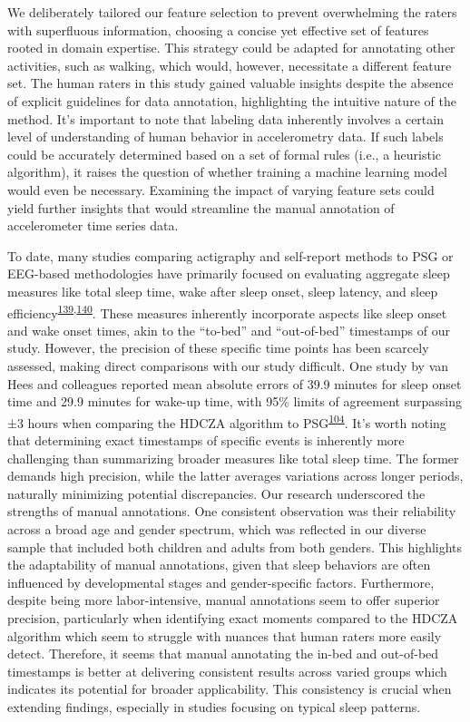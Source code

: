 \documentclass[
  10pt,
]{scrbook}
\begin{document}
We deliberately tailored our feature selection to prevent overwhelming
the raters with superfluous information, choosing a concise yet
effective set of features rooted in domain expertise. This strategy
could be adapted for annotating other activities, such as walking, which
would, however, necessitate a different feature set. The human raters in
this study gained valuable insights despite the absence of explicit
guidelines for data annotation, highlighting the intuitive nature of the
method. It's important to note that labeling data inherently involves a
certain level of understanding of human behavior in accelerometry data.
If such labels could be accurately determined based on a set of formal
rules (i.e., a heuristic algorithm), it raises the question of whether
training a machine learning model would even be necessary. Examining the
impact of varying feature sets could yield further insights that would
streamline the manual annotation of accelerometer time series data.

To date, many studies comparing actigraphy and self-report methods to
PSG or EEG-based methodologies have primarily focused on evaluating
aggregate sleep measures like total sleep time, wake after sleep onset,
sleep latency, and sleep
efficiency\textsuperscript{\protect\hyperlink{ref-haghayegh_application_2020}{139},\protect\hyperlink{ref-yavuz-kodat_2019}{140}}.
These measures inherently incorporate aspects like sleep onset and wake
onset times, akin to the ``to-bed'' and ``out-of-bed'' timestamps of our
study. However, the precision of these specific time points has been
scarcely assessed, making direct comparisons with our study difficult.
One study by van Hees and colleagues reported mean absolute errors of
39.9 minutes for sleep onset time and 29.9 minutes for wake-up time,
with 95\% limits of agreement surpassing ±3 hours when comparing the
HDCZA algorithm to
PSG\textsuperscript{\protect\hyperlink{ref-van_hees_estimating_2018}{104}}.
It's worth noting that determining exact timestamps of specific events
is inherently more challenging than summarizing broader measures like
total sleep time. The former demands high precision, while the latter
averages variations across longer periods, naturally minimizing
potential discrepancies. Our research underscored the strengths of
manual annotations. One consistent observation was their reliability
across a broad age and gender spectrum, which was reflected in our
diverse sample that included both children and adults from both genders.
This highlights the adaptability of manual annotations, given that sleep
behaviors are often influenced by developmental stages and
gender-specific factors. Furthermore, despite being more
labor-intensive, manual annotations seem to offer superior precision,
particularly when identifying exact moments compared to the HDCZA
algorithm which seem to struggle with nuances that human raters more
easily detect. Therefore, it seems that manual annotating the in-bed and
out-of-bed timestamps is better at delivering consistent results across
varied groups which indicates its potential for broader applicability.
This consistency is crucial when extending findings, especially in
studies focusing on typical sleep patterns.
\end{document}
